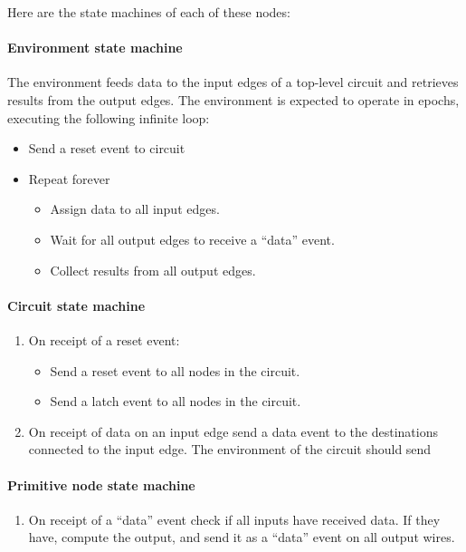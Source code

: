Here are the state machines of each of these nodes:

\paragraph{Environment state machine}

The environment feeds data to the input edges of a top-level circuit
and retrieves results from the output edges.
The environment is expected to operate in epochs, executing the
following infinite loop:

\begin{itemize}
    \item Send a reset event to circuit
    \item Repeat forever
    \begin{itemize}
        \item Assign data to all input edges.
        \item Wait for all output edges to receive a ``data'' event.
        \item Collect results from all output edges.
    \end{itemize}
\end{itemize}

\paragraph{Circuit state machine}

\begin{enumerate}
    \item On receipt of a reset event:
    \begin{itemize}
        \item Send a reset event to all nodes in the circuit.
        \item Send a latch event to all nodes in the circuit.
    \end{itemize}
    \item On receipt of data on an input edge send a data
    event to the destinations connected to the input edge.
    The environment of the circuit should send     
\end{enumerate}

\paragraph{Primitive node state machine}

\begin{enumerate}
    \item On receipt of a ``data'' event check if all
    inputs have received data.  If they have, compute
    the output, and send it as a ``data'' event on 
    all output wires.
\end{enumerate}

